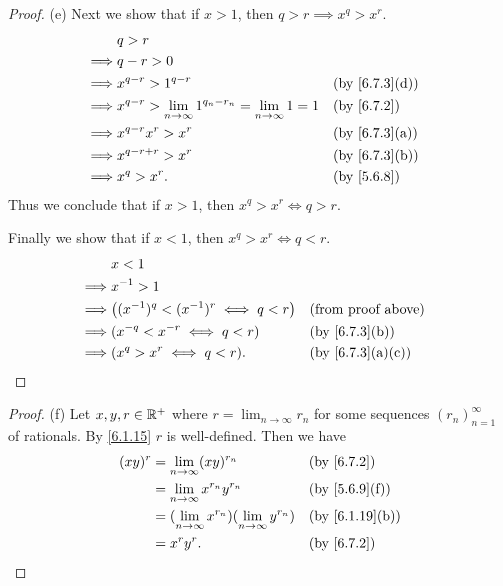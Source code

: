 \begin{proof}{(e)}
  Next we show that if \(x > 1\), then \(q > r \implies x^q > x^r\).
  \begin{align*}
             & q > r                                                                                                      \\
    \implies & q - r > 0                                                                                                  \\
    \implies & x^{q - r} > 1^{q - r}                                                     &  & \text{(by \cref{6.7.3}(d))} \\
    \implies & x^{q - r} > \lim_{n \to \infty} 1^{q_n - r_n} = \lim_{n \to \infty} 1 = 1 &  & \by{6.7.2}                  \\
    \implies & x^{q - r} x^r > x^r                                                       &  & \text{(by \cref{6.7.3}(a))} \\
    \implies & x^{q - r + r} > x^r                                                       &  & \text{(by \cref{6.7.3}(b))} \\
    \implies & x^q > x^r.                                                                &  & \by{5.6.8}
  \end{align*}
  Thus we conclude that if \(x > 1\), then \(x^q > x^r \iff q > r\).

  Finally we show that if \(x < 1\), then \(x^q > x^r \iff q < r\).
  \begin{align*}
             & x < 1                                                                            \\
    \implies & x^{-1} > 1                                                                       \\
    \implies & \big((x^{-1})^q < (x^{-1})^r \iff q < r\big) &  & \text{(from proof above)}      \\
    \implies & (x^{-q} < x^{-r} \iff q < r)                 &  & \text{(by \cref{6.7.3}(b))}    \\
    \implies & (x^q > x^r \iff q < r).                      &  & \text{(by \cref{6.7.3}(a)(c))}
  \end{align*}
\end{proof}

\begin{proof}{(f)}
  Let \(x, y, r \in \mathbb{R}^+\) where \(r = \lim_{n \to \infty} r_n\) for some sequences \((r_n)_{n = 1}^\infty\) of rationals.
  By \cref{6.1.15} \(r\) is well-defined.
  Then we have
  \begin{align*}
    (xy)^r & = \lim_{n \to \infty} (xy)^{r_n}                             &  & \by{6.7.2}                   \\
           & = \lim_{n \to \infty} x^{r_n} y^{r_n}                        &  & \text{(by \cref{5.6.9}(f))}  \\
           & = (\lim_{n \to \infty} x^{r_n})(\lim_{n \to \infty} y^{r_n}) &  & \text{(by \cref{6.1.19}(b))} \\
           & = x^r y^r.                                                   &  & \by{6.7.2}
  \end{align*}
\end{proof}

